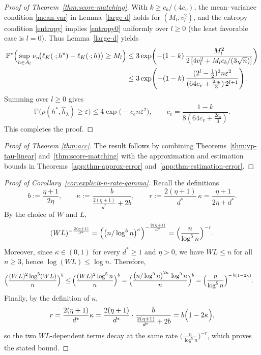 \documentclass[12pt]{article}
\theoremstyle{definition} %
\renewcommand{\P}{\ensuremath{\mathbb{P}}} %
\begin{document}
\begin{proof}[Proof of Theorem~\ref{thm:score-matching}]
With $k\ge c_b/(4c_v)$, the mean--variance condition \eqref{mean-var} in Lemma~\ref{large-d} holds for $(M_l,v_l^2)$, and the entropy condition \eqref{entropy} implies \eqref{entropy0} uniformly over $l\ge0$ (the least favorable case is $l=0$).
Thus Lemma~\ref{large-d} yields
\begin{align*}
\P^{*}\Bigl(
\sup_{h\in A_l}\nu_n\!\bigl(\ell_K(\cdot;h^\star)-\ell_K(\cdot;h)\bigr)
\ge M_l
\Bigr)
&\le 3\exp\!\left(-(1-k)\,\frac{M_l^{2}}{2\left[4v_l^2+M_l c_b/(3\sqrt n)\right]}\right)\\
&\le 3\exp\!\left(-(1-k)\,\frac{(2^l-\tfrac12)^2 n\varepsilon^2}{(64c_v+\frac{2c_b}{3})\,2^{l+1}}\right).
\end{align*}
Summing over $l\ge0$ gives
\[
\P\!\bigl(\rho(h^*,\hat h_{\lambda})\ge\varepsilon\bigr)
\le 4\exp\!\bigl(-c_e n\varepsilon^2\bigr),
\qquad
c_e=\frac{1-k}{8(64c_v+\frac{2c_b}{3})}.
\]
This completes the proof.
\end{proof}




\begin{proof}[Proof of Theorem \ref{thm:acc}]
The result follows by combining Theorems~\ref{thm:vp-tau-linear} and~\ref{thm:score-matching} with the approximation and estimation bounds in Theorems~\ref{app:thm-approx-error} and~\ref{app:thm-estimation-error}.
\end{proof}


\begin{proof}[Proof of Corollary~\ref{cor:explicit-n-rate-gamma}]
Recall the definitions
\[
b:=\frac{\eta+1}{2\eta},\qquad
\kappa:=\frac{b}{\frac{2(\eta+1)}{d^*}+2b},\qquad
r:=\frac{2(\eta+1)}{d^*}\,\kappa=\frac{\eta+1}{2\eta+d^*}.
\]
By the choice of $W$ and $L$,
\[
(WL)^{-\frac{2(\eta+1)}{d^*}}
=\Bigl(\bigl(n/\log^5 n\bigr)^{\kappa}\Bigr)^{-\frac{2(\eta+1)}{d^*}}
=\Bigl(\frac{n}{\log^5 n}\Bigr)^{-r}.
\]
Moreover, since $\kappa\in(0,1)$ for every $d^*\ge1$ and $\eta>0$, we have
$WL\le n$ for all $n\ge3$, hence $\log(WL)\le \log n$. Therefore,
\begin{align*}
\Bigl(\frac{(WL)^2\log^5(WL)}{n}\Bigr)^{b}
&\le
\Bigl(\frac{(WL)^2\log^5 n}{n}\Bigr)^{b}
=
\Bigl(\frac{\bigl(n/\log^5 n\bigr)^{2\kappa}\,\log^5 n}{n}\Bigr)^{b}
=
\Bigl(\frac{n}{\log^5 n}\Bigr)^{-\,b(1-2\kappa)}.
\end{align*}
Finally, by the definition of $\kappa$,
\[
r=\frac{2(\eta+1)}{d^*}\kappa
=\frac{2(\eta+1)}{d^*}\cdot\frac{b}{\frac{2(\eta+1)}{d^*}+2b}
=b\Bigl(1-2\kappa\Bigr),
\]
so the two $WL$-dependent terms decay at the same rate
$\bigl(\frac{n}{\log^5 n}\bigr)^{-r}$, which proves the stated bound.
\end{proof}
\end{document}
